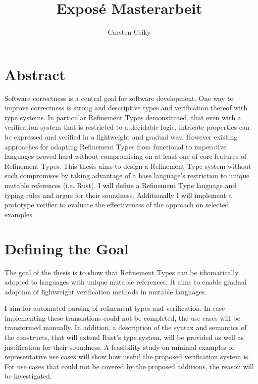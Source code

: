 \documentclass[11pt]{article}
\title{\textbf{Exposé Masterarbeit}}
\author{Carsten Csiky}
\date{}
\begin{document}
\maketitle

\section{Abstract}


Software correctness is a central goal for software development. 
One way to improve correctness is strong and descriptive types and verification thereof with type systems.
In particular Refinement Types demonstrated, that even with a verification system that is restricted to a decidable logic, intricate properties can be expressed and verified in a lightweight and gradual way.
However existing approaches for adapting Refinement Types from functional to imperative languages proved hard without compromising on at least one of core features of Refinement Types.
This thesis aims to design a Refinement Type system without such compromises by taking advantage of a base language's restriction to unique mutable references (i.e. Rust). 
I will define a Refinement Type language and typing rules and argue for their soundness. Additionally I will implement a prototype verifier to evaluate the effectiveness of the approach on selected examples.



\section{Defining the Goal}

The goal of the thesis is to show that Refinement Types can be idiomatically adapted to languages with unique mutable references. It aims to enable gradual adoption of lightweight verification methods in mutable languages.

I aim for automated parsing of refinement types and verification. 
In case implementing these translations could not be completed, the use cases will be transformed manually.
In addition, a description of the syntax and semantics of the constructs, that will extend Rust's type system, will be provided as well as justification for their soundness. A feasibility study on minimal examples of representative use cases will show how useful the proposed verification system is. For use cases that could not be covered by the proposed additions, the reason will be investigated.
\end{document}
